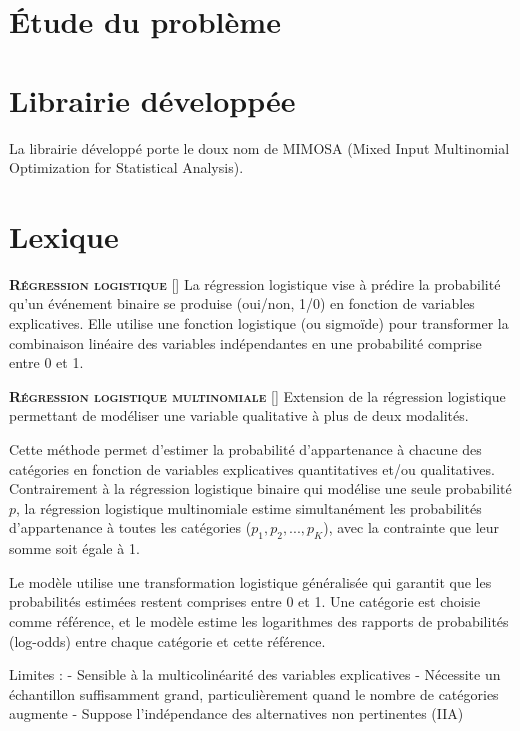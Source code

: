 \documentclass[10pt,french]{report}
\newcommand{\entreelex}[3][]{%
	{\large \textbf{\textsc{#2}}} %
	\if\relax\detokenize{#1}\relax %
	\else %
	\raisebox{0.15ex}{\scalebox{0.7}{$\Diamond$}} %
	[#1] %
	\fi
	\raisebox{0.13ex}{\scalebox{0.75}{$\blacksquare$}} #3 %
}
\begin{document}
	\chapter{Étude du problème}
	
	\chapter{Librairie développée}
	
	La librairie développé porte le doux nom de MIMOSA (Mixed Input Multinomial Optimization for Statistical Analysis).
	
	\chapter{Lexique}
	
	\entreelex{Régression logistique}{La régression logistique vise à prédire la probabilité qu'un événement binaire se produise (oui/non, 1/0) en fonction de variables explicatives. Elle utilise une fonction logistique (ou sigmoïde) pour transformer la combinaison linéaire des variables indépendantes en une probabilité comprise entre 0 et 1.}
	
	\entreelex{Régression logistique multinomiale}{Extension de la régression logistique permettant de modéliser une variable qualitative à plus de deux modalités.
	
	Cette méthode permet d'estimer la probabilité d'appartenance à chacune des catégories en fonction de variables explicatives quantitatives et/ou qualitatives. Contrairement à la régression logistique binaire qui modélise une seule probabilité $p$, la régression logistique multinomiale estime simultanément les probabilités d'appartenance à toutes les catégories ($p_1, p_2, ..., p_K$), avec la contrainte que leur somme soit égale à 1.
	
	Le modèle utilise une transformation logistique généralisée qui garantit que les probabilités estimées restent comprises entre 0 et 1. Une catégorie est choisie comme référence, et le modèle estime les logarithmes des rapports de probabilités (log-odds) entre chaque catégorie et cette référence.
	
	Limites :
	- Sensible à la multicolinéarité des variables explicatives
	- Nécessite un échantillon suffisamment grand, particulièrement quand le nombre de catégories augmente
	- Suppose l'indépendance des alternatives non pertinentes (IIA)}
	
\end{document}
